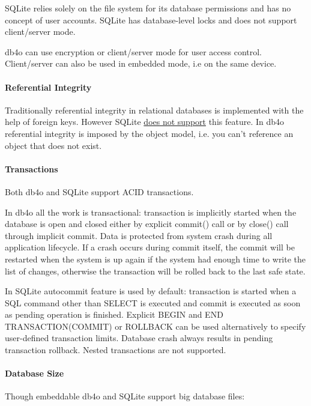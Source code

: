SQLite relies solely on the file system for its database permissions and has no concept of user accounts. SQLite has database-level locks and does not support client/server mode.

db4o can use encryption or client/server mode for user access control. Client/server can also be used in embedded mode, i.e on the same device.

\paragraph*{Referential Integrity}

Traditionally referential integrity in relational databases is implemented with the help of foreign keys. However SQLite \href{https://www.sqlite.org/omitted.html}{does not support} this feature. In db4o referential integrity is imposed by the object model, i.e. you can't reference an object that does not exist.

\paragraph*{Transactions}

Both db4o and SQLite support ACID transactions.

In db4o all the work is transactional: transaction is implicitly started when the database is open and closed either by explicit commit() call or by close() call through implicit commit. Data is protected from system crash during all application lifecycle. If a crash occurs during commit itself, the commit will be restarted when the system is up again if the system had enough time to write the list of changes, otherwise the transaction will be rolled back to the last safe state.

In SQLite autocommit feature is used by default: transaction is started when a SQL command other than SELECT is executed and commit is executed as soon as pending operation is finished. Explicit BEGIN and END TRANSACTION(COMMIT) or ROLLBACK can be used alternatively to specify user-defined transaction limits. Database crash always results in pending transaction rollback. Nested transactions are not supported.

\paragraph*{Database Size}

Though embeddable db4o and SQLite support big database files:

